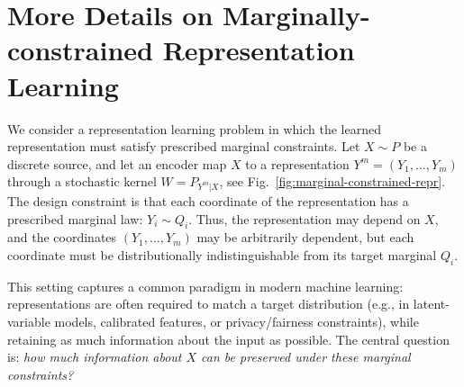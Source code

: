 \documentclass[journal]{IEEEtran}
\newcommand{\1}{\mathbf{1}}
\begin{document}

{
%
%


}



\appendices
\section{More Details on Marginally-constrained Representation Learning}\label{app:RepresentationLearning}
We consider a representation learning problem in which the learned representation must satisfy prescribed marginal constraints. Let $X\sim P$ be a discrete source, and let an encoder map $X$ to a representation \(Y^m=(Y_1,\dots,Y_m)\)
through a stochastic kernel $W=P_{Y^m|X}$, see Fig.\ \ref{fig:marginal-constrained-repr}. The design constraint is that each coordinate of the representation has a prescribed marginal law:
\(Y_i\sim Q_i.\) Thus, the representation may depend on $X$, and the coordinates $(Y_1,\dots,Y_m)$ may be arbitrarily dependent, but each coordinate must be distributionally indistinguishable from its target marginal $Q_i$. 


This setting captures a common paradigm in modern machine learning: representations are often required to match a target distribution (e.g., in latent-variable models, calibrated features, or privacy/fairness constraints), while retaining as much information about the input as possible. The central question is: \emph{how much information about $X$ can be preserved under these marginal constraints?}
\end{document}
